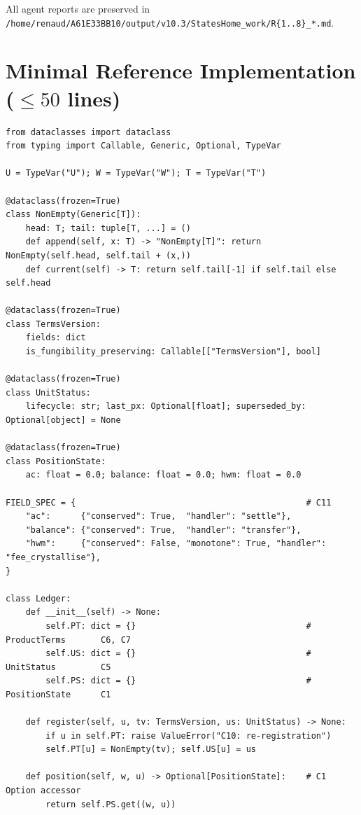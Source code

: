 \documentclass[11pt,a4paper]{article}
\begin{document}
\noindent All agent reports are preserved in \texttt{/home/renaud/A61E33BB10/output/v10.3/StatesHome\_work/R\{1..8\}\_*.md}.

\section{Minimal Reference Implementation ($\leq 50$ lines)}
\label{sec:reference}

\begin{lstlisting}[language=pythonstyle]
from dataclasses import dataclass
from typing import Callable, Generic, Optional, TypeVar

U = TypeVar("U"); W = TypeVar("W"); T = TypeVar("T")

@dataclass(frozen=True)
class NonEmpty(Generic[T]):
    head: T; tail: tuple[T, ...] = ()
    def append(self, x: T) -> "NonEmpty[T]": return NonEmpty(self.head, self.tail + (x,))
    def current(self) -> T: return self.tail[-1] if self.tail else self.head

@dataclass(frozen=True)
class TermsVersion:
    fields: dict
    is_fungibility_preserving: Callable[["TermsVersion"], bool]

@dataclass(frozen=True)
class UnitStatus:
    lifecycle: str; last_px: Optional[float]; superseded_by: Optional[object] = None

@dataclass(frozen=True)
class PositionState:
    ac: float = 0.0; balance: float = 0.0; hwm: float = 0.0

FIELD_SPEC = {                                              # C11
    "ac":      {"conserved": True,  "handler": "settle"},
    "balance": {"conserved": True,  "handler": "transfer"},
    "hwm":     {"conserved": False, "monotone": True, "handler": "fee_crystallise"},
}

class Ledger:
    def __init__(self) -> None:
        self.PT: dict = {}                                  # ProductTerms       C6, C7
        self.US: dict = {}                                  # UnitStatus         C5
        self.PS: dict = {}                                  # PositionState      C1

    def register(self, u, tv: TermsVersion, us: UnitStatus) -> None:
        if u in self.PT: raise ValueError("C10: re-registration")
        self.PT[u] = NonEmpty(tv); self.US[u] = us

    def position(self, w, u) -> Optional[PositionState]:    # C1 Option accessor
        return self.PS.get((w, u))


\end{lstlisting}
\end{document}
